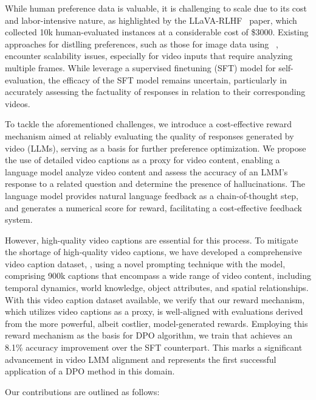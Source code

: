 While human preference data is valuable, it is challenging to scale due to its cost and labor-intensive nature, as highlighted by the LLaVA-RLHF~\citep{sun2023aligning} paper, which collected 10k human-evaluated instances at a considerable cost of \$3000. Existing approaches for distlling preferences, such as those for image data using \gptv~\citep{li2023silkie}, encounter scalability issues, especially for video inputs that require analyzing multiple frames. While \cite{ahn2024tuning} leverage a supervised finetuning (SFT) model for self-evaluation, the efficacy of the SFT model remains uncertain, particularly in accurately assessing the factuality of responses in relation to their corresponding videos.

To tackle the aforementioned challenges, we introduce a cost-effective reward mechanism aimed at reliably evaluating the quality of responses generated by video (LLMs), serving as a basis for further preference optimization. 
We propose the use of detailed video captions as a proxy for video content, enabling a language model analyze video content and assess the accuracy of an LMM's response to a related question and determine the presence of hallucinations. The language model provides natural language feedback as a chain-of-thought step, and generates a numerical score for reward, facilitating a cost-effective feedback system. 

However, high-quality video captions are essential for this process. To mitigate the shortage of high-quality video captions, we have developed a comprehensive video caption dataset, \datasetname, using a novel prompting technique with the \gptv model, comprising 900k captions that encompass a wide range of video content, including temporal dynamics, world knowledge, object attributes, and spatial relationships.
With this video caption dataset available, we verify that our reward mechanism, which utilizes video captions as a proxy, is well-aligned with evaluations derived from the more powerful, albeit costlier, \gptv model-generated rewards. Employing this reward mechanism as the basis for DPO algorithm, we train \modelname that achieves an 8.1\% accuracy improvement over the SFT counterpart. This marks a significant advancement in video LMM alignment and represents the first successful application of a DPO method in this domain.

Our contributions are outlined as follows:

